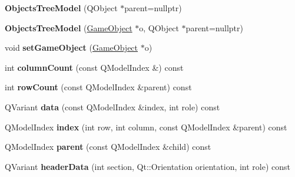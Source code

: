 \begin{DoxyCompactItemize}
\item 
\hypertarget{class_objects_tree_model_a4cc5d9d4f4a979715d93841b8d76c996}{{\bfseries \-Objects\-Tree\-Model} (\-Q\-Object $\ast$parent=nullptr)}\label{class_objects_tree_model_a4cc5d9d4f4a979715d93841b8d76c996}

\item 
\hypertarget{class_objects_tree_model_a5661982a1cc727ac0961e2961395fb96}{{\bfseries \-Objects\-Tree\-Model} (\hyperlink{class_game_object}{\-Game\-Object} $\ast$o, \-Q\-Object $\ast$parent=nullptr)}\label{class_objects_tree_model_a5661982a1cc727ac0961e2961395fb96}

\item 
\hypertarget{class_objects_tree_model_a009ac110d33747aff36bd5ab1e07211a}{void {\bfseries set\-Game\-Object} (\hyperlink{class_game_object}{\-Game\-Object} $\ast$o)}\label{class_objects_tree_model_a009ac110d33747aff36bd5ab1e07211a}

\item 
\hypertarget{class_objects_tree_model_a41005844e75c80f30b638b50d36653c4}{int {\bfseries column\-Count} (const \-Q\-Model\-Index \&) const }\label{class_objects_tree_model_a41005844e75c80f30b638b50d36653c4}

\item 
\hypertarget{class_objects_tree_model_aa7740390e180a7663e3341a5aa56c49b}{int {\bfseries row\-Count} (const \-Q\-Model\-Index \&parent) const }\label{class_objects_tree_model_aa7740390e180a7663e3341a5aa56c49b}

\item 
\hypertarget{class_objects_tree_model_a98fe0687618c87c84f5519c92d729aa0}{\-Q\-Variant {\bfseries data} (const \-Q\-Model\-Index \&index, int role) const }\label{class_objects_tree_model_a98fe0687618c87c84f5519c92d729aa0}

\item 
\hypertarget{class_objects_tree_model_a8c9f9980e0268c7125f97ce9e45e026d}{\-Q\-Model\-Index {\bfseries index} (int row, int column, const \-Q\-Model\-Index \&parent) const }\label{class_objects_tree_model_a8c9f9980e0268c7125f97ce9e45e026d}

\item 
\hypertarget{class_objects_tree_model_a304b4e2110a7ab9e697d1ace64885792}{\-Q\-Model\-Index {\bfseries parent} (const \-Q\-Model\-Index \&child) const }\label{class_objects_tree_model_a304b4e2110a7ab9e697d1ace64885792}

\item 
\hypertarget{class_objects_tree_model_ae8574c384005c730762b083eb3863d74}{\-Q\-Variant {\bfseries header\-Data} (int section, \-Qt\-::\-Orientation orientation, int role) const }\label{class_objects_tree_model_ae8574c384005c730762b083eb3863d74}


\end{DoxyCompactItemize}
